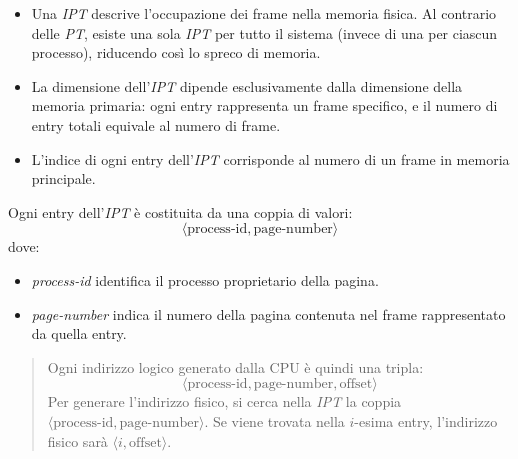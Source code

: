 \begin{itemize}
    \item Una \emph{IPT} descrive l’occupazione dei frame nella memoria fisica. Al contrario delle \emph{PT}, esiste una sola \emph{IPT} per tutto il sistema (invece di una per ciascun processo), riducendo così lo spreco di memoria.
    \item La dimensione dell’\emph{IPT} dipende esclusivamente dalla dimensione della memoria primaria: ogni entry rappresenta un frame specifico, e il numero di entry totali equivale al numero di frame.
    \item L’indice di ogni entry dell’\emph{IPT} corrisponde al numero di un frame in memoria principale.
\end{itemize}

Ogni entry dell'\emph{IPT} è costituita da una coppia di valori:
\[
\langle \text{process-id}, \text{page-number} \rangle
\]
dove:
\begin{itemize}
    \item \emph{process-id} identifica il processo proprietario della pagina.
    \item \emph{page-number} indica il numero della pagina contenuta nel frame rappresentato da quella entry.
\end{itemize}

\begin{quote}
Ogni indirizzo logico generato dalla CPU è quindi una tripla:
\[
\langle \text{process-id}, \text{page-number}, \text{offset} \rangle
\]
Per generare l'indirizzo fisico, si cerca nella \emph{IPT} la coppia \(\langle \text{process-id}, \text{page-number} \rangle\). Se viene trovata nella \(i\)-esima entry, l'indirizzo fisico sarà \(\langle i, \text{offset} \rangle\).
\end{quote}


